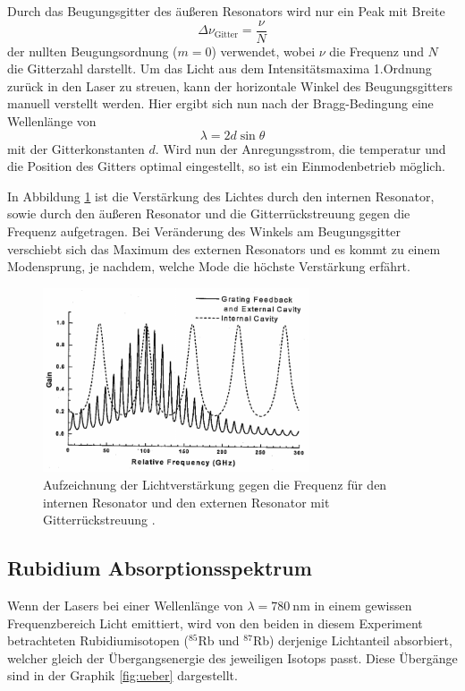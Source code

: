 Durch das Beugungsgitter des äußeren Resonators wird nur ein Peak mit Breite
\begin{equation}
  \Delta\nu_{\text{Gitter}} = \frac{\nu}{N}
\end{equation}
der nullten Beugungsordnung ($m=\num{0}$) verwendet, wobei $\nu$ die Frequenz
und $N$ die Gitterzahl darstellt. Um das Licht aus dem Intensitätsmaxima 1.Ordnung
zurück in den Laser zu streuen, kann der horizontale Winkel \theta des Beugungsgitters
manuell verstellt werden. Hier ergibt sich nun nach der Bragg-Bedingung eine
Wellenlänge von
\begin{equation}
    \lambda = 2d\sin{\theta}
\end{equation}
mit der Gitterkonstanten $d$. Wird nun der Anregungsstrom, die temperatur und die
Position des Gitters optimal eingestellt, so ist ein Einmodenbetrieb möglich.


In Abbildung \ref{fig:gain_freq} ist die Verstärkung des Lichtes durch den internen
Resonator, sowie durch den äußeren Resonator und die Gitterrückstreuung gegen
die Frequenz aufgetragen. Bei Veränderung des Winkels am Beugungsgitter verschiebt
sich das Maximum des externen Resonators und es kommt zu einem Modensprung, je
nachdem, welche Mode die höchste Verstärkung erfährt.

\begin{figure}[htb]
  \centering
  \includegraphics[width=0.7\textwidth]{images/gain-freq.pdf}
  \caption{Aufzeichnung der Lichtverstärkung gegen die Frequenz für den internen
  Resonator und den externen Resonator mit Gitterrückstreuung \cite{anleitung}.}
  \label{fig:gain_freq}
\end{figure}

\subsection{Rubidium Absorptionsspektrum}
Wenn der Lasers bei einer Wellenlänge von $\lambda = \SI{780}{\nano\meter}$ in
einem gewissen Frequenzbereich Licht emittiert, wird von den
beiden in diesem Experiment betrachteten Rubidiumisotopen ($^{85}$Rb und $^{87}$Rb)
derjenige Lichtanteil absorbiert, welcher gleich der Übergangsenergie des jeweiligen
Isotops passt. Diese Übergänge sind in der Graphik \ref{fig:ueber} dargestellt.

